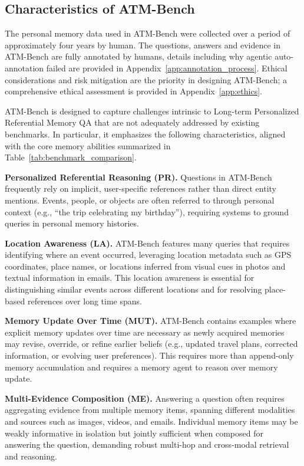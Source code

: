 \documentclass{article}
\theoremstyle{plain}
\theoremstyle{definition}
\theoremstyle{remark}
\begin{document}
\subsection{Characteristics of ATM-Bench}

The personal memory data used in ATM-Bench were collected over a period of approximately four years by human. The questions, answers and evidence in ATM-Bench are fully annotated by humans, details including why agentic auto-annotation failed are provided in Appendix~\ref{app:annotation_process}. Ethical considerations and risk mitigation are the priority in designing ATM-Bench; a comprehensive ethical assessment is provided in Appendix~\ref{app:ethics}.

ATM-Bench is designed to capture challenges intrinsic to Long-term Personalized Referential Memory QA that are not adequately addressed by existing benchmarks. In particular, it emphasizes the following characteristics, aligned with the core memory abilities summarized in Table~\ref{tab:benchmark_comparison}.

\textbf{Personalized Referential Reasoning (PR).}
Questions in ATM-Bench frequently rely on implicit, user-specific references rather than direct entity mentions. Events, people, or objects are often referred to through personal context (e.g., “the trip celebrating my birthday”), requiring systems to ground queries in personal memory histories.

\textbf{Location Awareness (LA).}
ATM-Bench features many queries that requires identifying where an event occurred, leveraging location metadata such as GPS coordinates, place names, or locations inferred from visual cues in photos and textual information in emails. This location awareness is essential for distinguishing similar events across different locations and for resolving place-based references over long time spans.

\textbf{Memory Update Over Time (MUT).}
ATM-Bench contains examples where explicit memory updates over time are necessary as newly acquired memories may revise, override, or refine earlier beliefs (e.g., updated travel plans, corrected information, or evolving user preferences). This requires more than append-only memory accumulation and requires a memory agent to reason over memory update.

\textbf{Multi-Evidence Composition (ME).}
Answering a question often requires aggregating evidence from multiple memory items, spanning different modalities and sources such as images, videos, and emails. Individual memory items may be weakly informative in isolation but jointly sufficient when composed for answering the question, demanding robust multi-hop and cross-modal retrieval and reasoning. 
\end{document}
